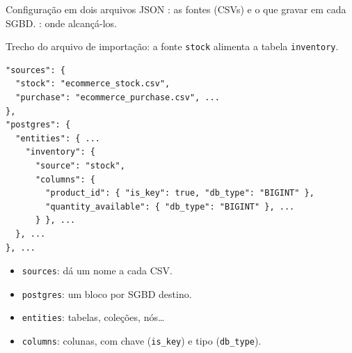 \begin{frame}[fragile,label=configuracao]{Configuração em dois arquivos JSON}
  \begingroup\small{}: as fontes (CSVs) e o que gravar em cada SGBD.
  : onde alcançá-los.\par\endgroup
  \smallskip
  \begingroup\footnotesize Trecho do arquivo de importação: a fonte \texttt{stock}
  alimenta a tabela \texttt{inventory}.\par\endgroup
  \smallskip
  \begin{minipage}[t]{0.66\textwidth}
\begin{lstlisting}[style=jsonslide, aboveskip=0pt, belowskip=0pt]
"sources": {
  "stock": "ecommerce_stock.csv",
  "purchase": "ecommerce_purchase.csv", ...
},
"postgres": {
  "entities": { ...
    "inventory": {
      "source": "stock",
      "columns": {
        "product_id": { "is_key": true, "db_type": "BIGINT" },
        "quantity_available": { "db_type": "BIGINT" }, ...
      } }, ...
  }, ...
}, ...
\end{lstlisting}
  \end{minipage}\hfill
  \begin{minipage}[t]{0.32\textwidth}
    \footnotesize
    \begin{itemize}
      \item \texttt{sources}: dá um nome a cada CSV.
      \item \texttt{postgres}: um bloco por SGBD destino.
      \item \texttt{entities}: tabelas, coleções, nós\ldots
      \item \texttt{columns}: colunas, com chave (\texttt{is\_key}) e tipo
            (\texttt{db\_type}).    \end{itemize}
  \end{minipage}
\end{frame}

